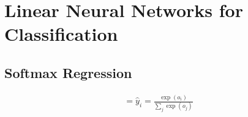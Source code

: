 \documentclass[a4paper,12pt]{article}
\theoremstyle{definition}
\begin{document}
\section*{Linear Neural Networks for Classification}
    \subsection*{Softmax Regression}


    \begin{equation*}
        \begin{aligned}
             = \hat{y}_i = \frac{\exp(o_i)}{\sum_{j}\exp(o_j)}
        \end{aligned}
    \end{equation*}
    
\end{document}
